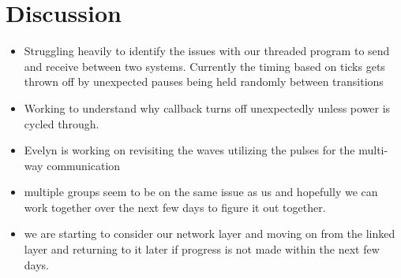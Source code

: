 \documentclass{article}
\begin{document}
\section*{Discussion}
\begin{itemize}
\item Struggling heavily to identify the issues with our threaded program to send and receive between two systems. Currently the timing based on ticks gets thrown off by unexpected pauses being held randomly between transitions
\item Working to understand why callback turns off unexpectedly unless power is cycled through.  
\item Evelyn is working on revisiting the waves utilizing the pulses for the multi-way communication
\item multiple groups seem to be on the same issue as us and hopefully we can work together over the next few days to figure it out together.
\item we are starting to consider our network layer and moving on from the linked layer and returning to it later if progress is not made within the next few days.
\end{itemize}
\end{document}

